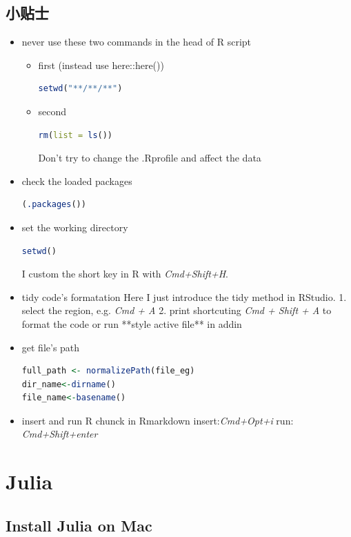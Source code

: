 \section{小贴士}
\begin{itemize}
\item never use these two commands in the head of R script
\begin{itemize}
\item first (instead use here::here())
\begin{lstlisting}[language=R]
setwd("**/**/**")
\end{lstlisting}
\item second 
\begin{lstlisting}[language=R]
rm(list = ls())
\end{lstlisting}
Don't try to change the .Rprofile and affect the data
\end{itemize}

\item check the loaded packages
\begin{lstlisting}[language=R]
(.packages())
\end{lstlisting}

\item set the working directory
\begin{lstlisting}[language=R]
setwd()
\end{lstlisting}
I custom the short key in R with \emph{Cmd+Shift+H}.

\item tidy code's formatation
Here I just introduce the tidy method in RStudio.
1. select the region, e.g. \emph{Cmd + A}
2. print shortcuting \emph{Cmd + Shift + A} to format the code or run **style active file** in addin

\item get file's path
\begin{lstlisting}[language=R]
full_path <- normalizePath(file_eg)
dir_name<-dirname()
file_name<-basename()
\end{lstlisting}

\item insert and run R chunck in Rmarkdown
insert:\emph{Cmd+Opt+i}
run: \emph{Cmd+Shift+enter}

\end{itemize}

\chapter{Julia}

\section{Install Julia on Mac}










